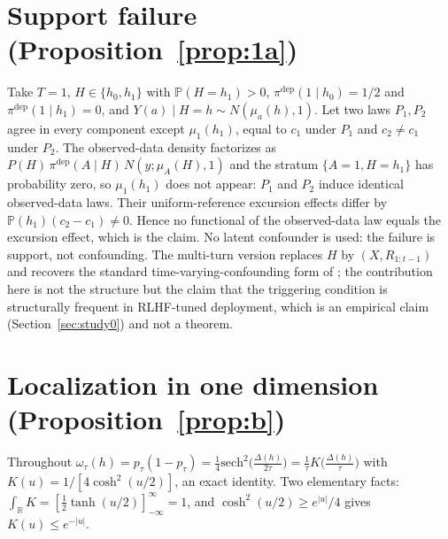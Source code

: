 \documentclass[11pt]{article}
\theoremstyle{definition}
\theoremstyle{remark}
\newcommand{\Prob}{\mathbb{P}}
\begin{document}
\section{Support failure (Proposition~\ref{prop:1a})}\label{app:support}

Take $T=1$, $H \in \{h_0, h_1\}$ with $\Prob(H = h_1) > 0$,
$\pi^{\mathrm{dep}}(1 \mid h_0) = 1/2$ and $\pi^{\mathrm{dep}}(1 \mid h_1) =
0$, and $Y(a) \mid H=h \sim N(\mu_a(h), 1)$. Let two laws $P_1, P_2$ agree
in every component except $\mu_1(h_1)$, equal to $c_1$ under $P_1$ and $c_2
\neq c_1$ under $P_2$. The observed-data density factorizes as
$P(H)\,\pi^{\mathrm{dep}}(A \mid H)\,N(y; \mu_A(H), 1)$ and the stratum
$\{A = 1, H = h_1\}$ has probability zero, so $\mu_1(h_1)$ does not appear:
$P_1$ and $P_2$ induce identical observed-data laws. Their uniform-reference
excursion effects differ by $\Prob(h_1)(c_2 - c_1) \neq 0$. Hence no
functional of the observed-data law equals the excursion effect, which is
the claim. No latent confounder is used: the failure is support, not
confounding. The multi-turn version replaces $H$ by $(X, R_{1:t-1})$ and
recovers the standard time-varying-confounding form of
\citet{robins1986new}; the contribution here is not the structure but the
claim that the triggering condition is structurally frequent in RLHF-tuned
deployment, which is an empirical claim (Section~\ref{sec:study0}) and not a
theorem.

\section{Localization in one dimension (Proposition~\ref{prop:b})}
\label{app:resultB}

Throughout $\omega_\tau(h) = p_\tau(1-p_\tau) = \frac{1}{4}\mathrm{sech}^2
\!\big(\tfrac{\Delta(h)}{2\tau}\big) = \tfrac{1}{\tau}K\!\big(
\tfrac{\Delta(h)}{\tau}\big)$ with $K(u) = 1/[4\cosh^2(u/2)]$, an exact
identity. Two elementary facts: $\int_{\mathbb{R}} K = [\tfrac12
\tanh(u/2)]_{-\infty}^{\infty} = 1$, and $\cosh^2(u/2) \geq e^{|u|}/4$ gives
$K(u) \leq e^{-|u|}$.
\end{document}

